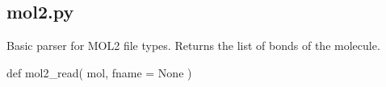 \normalsize
\subsection[mol2]{mol2.py}
Basic parser for MOL2 file types. Returns the list of bonds of the molecule.
\begin{pyglist}[language=python,fvset={frame=single}]
def mol2_read( mol, fname = None )
\end{pyglist}
